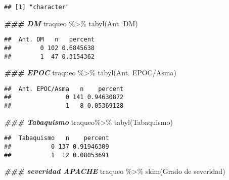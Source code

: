 \documentclass[
]{article}
\newenvironment{Shaded}{\begin{snugshade}}{\end{snugshade}}
\newcommand{\AttributeTok}[1]{\textcolor[rgb]{0.77,0.63,0.00}{#1}}
\newcommand{\DocumentationTok}[1]{\textcolor[rgb]{0.56,0.35,0.01}{\textbf{\textit{#1}}}}
\newcommand{\FunctionTok}[1]{\textcolor[rgb]{0.00,0.00,0.00}{#1}}
\newcommand{\NormalTok}[1]{#1}
\newcommand{\SpecialCharTok}[1]{\textcolor[rgb]{0.00,0.00,0.00}{#1}}
\newcommand{\StringTok}[1]{\textcolor[rgb]{0.31,0.60,0.02}{#1}}
\begin{document}
\begin{verbatim}
## [1] "character"
\end{verbatim}

\begin{Shaded}
\begin{Highlighting}[]
\DocumentationTok{\#\#\# DM}
\NormalTok{traqueo }\SpecialCharTok{\%\textgreater{}\%}
  \FunctionTok{tabyl}\NormalTok{(}\StringTok{\textasciigrave{}}\AttributeTok{Ant. DM}\StringTok{\textasciigrave{}}\NormalTok{)}
\end{Highlighting}
\end{Shaded}

\begin{verbatim}
##  Ant. DM   n   percent
##        0 102 0.6845638
##        1  47 0.3154362
\end{verbatim}

\begin{Shaded}
\begin{Highlighting}[]
\DocumentationTok{\#\#\# EPOC}
\NormalTok{traqueo }\SpecialCharTok{\%\textgreater{}\%}
  \FunctionTok{tabyl}\NormalTok{(}\StringTok{\textasciigrave{}}\AttributeTok{Ant. EPOC/Asma}\StringTok{\textasciigrave{}}\NormalTok{)}
\end{Highlighting}
\end{Shaded}

\begin{verbatim}
##  Ant. EPOC/Asma   n    percent
##               0 141 0.94630872
##               1   8 0.05369128
\end{verbatim}

\begin{Shaded}
\begin{Highlighting}[]
\DocumentationTok{\#\#\# Tabaquismo}
\NormalTok{traqueo}\SpecialCharTok{\%\textgreater{}\%}
  \FunctionTok{tabyl}\NormalTok{(Tabaquismo)}
\end{Highlighting}
\end{Shaded}

\begin{verbatim}
##  Tabaquismo   n    percent
##           0 137 0.91946309
##           1  12 0.08053691
\end{verbatim}

\begin{Shaded}
\begin{Highlighting}[]
\DocumentationTok{\#\#\# severidad APACHE}
\NormalTok{traqueo }\SpecialCharTok{\%\textgreater{}\%}
  \FunctionTok{skim}\NormalTok{(}\StringTok{\textasciigrave{}}\AttributeTok{Grado de severidad}\StringTok{\textasciigrave{}}\NormalTok{)}
\end{Highlighting}
\end{Shaded}
\end{document}
